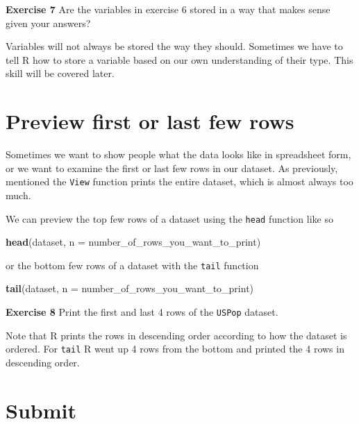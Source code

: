 \documentclass[
]{book}
\newenvironment{Shaded}{\begin{snugshade}}{\end{snugshade}}
\newcommand{\DataTypeTok}[1]{\textcolor[rgb]{0.13,0.29,0.53}{#1}}
\newcommand{\KeywordTok}[1]{\textcolor[rgb]{0.13,0.29,0.53}{\textbf{#1}}}
\newcommand{\NormalTok}[1]{#1}
\newenvironment{learncheck}%
{%
  \par\vspace{\baselineskip}\noindent 
  \color{Exercise}\begin{itshape}%
  \par\vspace{\baselineskip}\noindent\ignorespaces 
}%
{%
  \end{itshape}\ignorespacesafterend 
}
\begin{document}
\begin{learncheck}
\textbf{Exercise 7} Are the variables in exercise 6 stored in a way that
makes sense given your answers?
\end{learncheck}

Variables will not always be stored the way they should. Sometimes we have to tell R how to store a variable based on our own understanding of their type. This skill will be covered later.

\hypertarget{preview-first-or-last-few-rows}{%
\section{Preview first or last few rows}\label{preview-first-or-last-few-rows}}

Sometimes we want to show people what the data looks like in spreadsheet form, or we want to examine the first or last few rows in our dataset. As previously, mentioned the \texttt{View} function prints the entire dataset, which is almost always too much.

We can preview the top few rows of a dataset using the \texttt{head} function like so

\begin{Shaded}
\begin{Highlighting}[]
\KeywordTok{head}\NormalTok{(dataset, }\DataTypeTok{n =}\NormalTok{ number_of_rows_you_want_to_print)}
\end{Highlighting}
\end{Shaded}

or the bottom few rows of a dataset with the \texttt{tail} function

\begin{Shaded}
\begin{Highlighting}[]
\KeywordTok{tail}\NormalTok{(dataset, }\DataTypeTok{n =}\NormalTok{ number_of_rows_you_want_to_print)}
\end{Highlighting}
\end{Shaded}

\begin{learncheck}
\textbf{Exercise 8} Print the first and last 4 rows of the
\texttt{USPop} dataset.
\end{learncheck}

Note that R prints the rows in descending order according to how the dataset is ordered. For \texttt{tail} R went up 4 rows from the bottom and printed the 4 rows in descending order.

\hypertarget{submit}{%
\section{Submit}\label{submit}}
\end{document}

